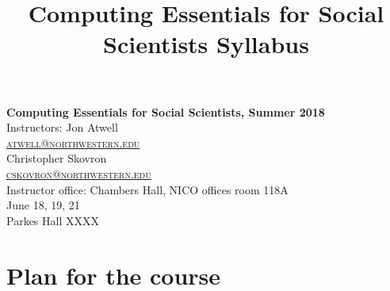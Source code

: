 \documentclass[11pt, letterpaper]{article}
\title{Computing Essentials for Social Scientists Syllabus
}
\begin{document}


\noindent
\textbf{Computing Essentials for Social Scientists, Summer 2018}\\
Instructors: Jon Atwell\\
\href{mailto:atwell@northwestern.edu}{\textsc{atwell@northwestern.edu}}\\
Christopher Skovron\\
\href{mailto:cskovron@northwestern.edu}{\textsc{cskovron@northwestern.edu}}\\
Instructor office: Chambers Hall, NICO offices room 118A 
\\
June 18, 19, 21\\
Parkes Hall XXXX


\section*{Plan for the course}
\end{document}
